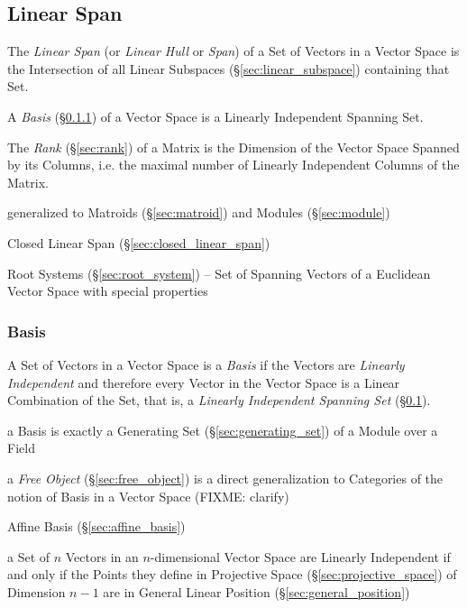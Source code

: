 \subsection{Linear Span}\label{sec:linear_span}

The \emph{Linear Span} (or \emph{Linear Hull} or \emph{Span}) of a Set of
Vectors in a Vector Space is the Intersection of all Linear Subspaces
(\S\ref{sec:linear_subspace}) containing that Set.

A \emph{Basis} (\S\ref{sec:basis}) of a Vector Space is a Linearly Independent
Spanning Set.

The \emph{Rank} (\S\ref{sec:rank}) of a Matrix is the Dimension of the Vector
Space Spanned by its Columns, i.e. the maximal number of Linearly Independent
Columns of the Matrix.

generalized to Matroids (\S\ref{sec:matroid}) and Modules (\S\ref{sec:module})

Closed Linear Span (\S\ref{sec:closed_linear_span})

\fist Root Systems (\S\ref{sec:root_system}) -- Set of Spanning Vectors of a
Euclidean Vector Space with special properties



\subsubsection{Basis}\label{sec:basis}

A Set of Vectors in a Vector Space is a \emph{Basis} if the Vectors are
\emph{Linearly Independent} and therefore every Vector in the Vector Space is a
Linear Combination of the Set, that is, a \emph{Linearly Independent Spanning
  Set} (\S\ref{sec:linear_span}).

a Basis is exactly a Generating Set (\S\ref{sec:generating_set}) of a Module
over a Field

\fist a \emph{Free Object} (\S\ref{sec:free_object}) is a direct generalization
to Categories of the notion of Basis in a Vector Space
(FIXME: clarify)

\fist Affine Basis (\S\ref{sec:affine_basis})

a Set of $n$ Vectors in an $n$-dimensional Vector Space are Linearly
Independent if and only if the Points they define in Projective Space
(\S\ref{sec:projective_space}) of Dimension $n-1$ are in General Linear
Position (\S\ref{sec:general_position})

